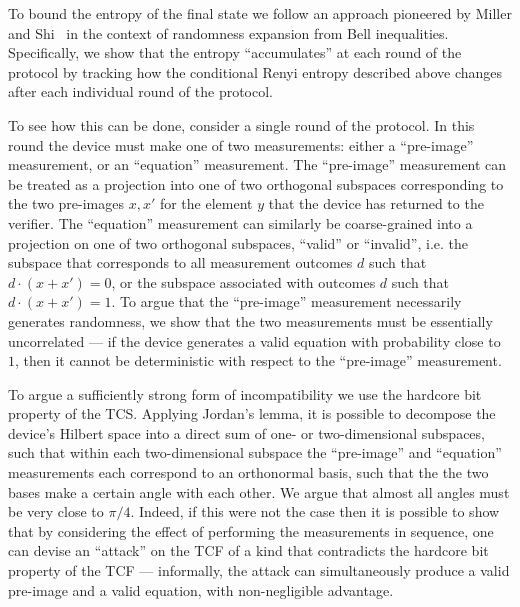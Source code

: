 \documentclass[11pt]{article}
\theoremstyle{remark}
\theoremstyle{definition}
\begin{document}
To bound the entropy of the final state we follow an approach pioneered by Miller and Shi~\cite{miller2014universal} in the context of randomness expansion from Bell inequalities. Specifically, we show that the entropy ``accumulates'' at each round of the protocol by tracking how the conditional Renyi entropy described above changes after each individual round of the protocol. 

To see how this can be done,  consider a single round of the protocol. In this round the device must make one of two measurements: either a ``pre-image'' measurement, or an ``equation'' measurement. The ``pre-image'' measurement can be treated as a projection into one of two orthogonal subspaces corresponding to the two pre-images $x,x'$ for the element $y$ that the device has returned to the verifier. The ``equation''
measurement can similarly be coarse-grained into a projection on one of two orthogonal subspaces, ``valid'' or ``invalid'', i.e. the subspace that corresponds to all measurement outcomes $d$ such that $d\cdot(x + x') = 0$, or the subspace associated with outcomes $d$ such that $d\cdot(x + x') = 1$.
To argue that the ``pre-image'' measurement necessarily generates randomness, we show that the two measurements must be essentially uncorrelated --- if the device generates a valid equation with probability close to $1$, then it cannot be deterministic with respect to the ``pre-image'' measurement. 

To argue a sufficiently strong form of incompatibility we use the hardcore bit property of the TCS. Applying Jordan's lemma, it is possible to decompose the device's Hilbert space into a direct sum of one- or two-dimensional subspaces, such that within each two-dimensional subspace the ``pre-image'' and ``equation'' measurements each correspond to an orthonormal basis, such that the the two bases make a certain angle with each other. We argue that almost all angles must be very close to $\pi/4$. Indeed, if this were not the case then it is possible to show that by considering the effect of performing the measurements in sequence, one can devise an ``attack'' on the TCF of a kind that contradicts the hardcore bit property of the TCF --- informally, the attack can simultaneously produce a valid pre-image and a valid equation, with non-negligible advantage. 
\end{document}
